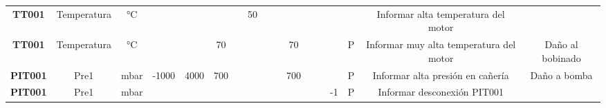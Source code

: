 \begin{table}
\begin{tabular}{ccccccccccccccccc}
		\textbf{TT001}                            & Temperatura                        & °C                                 &                                            &                                            &                                              &                                           & 50                                        &                                              &                                              &                                              &                                           &                                           &                                              &                                            & Informar alta temperatura del motor     &                                        \\
		\textbf{TT001}                            & Temperatura                        & °C                                 &                                            &                                            & 70                                           &                                           &                                           &                                              &                                              & 70                                           &                                           &                                           &                                              & P                                          & Informar muy alta temperatura del motor & Daño al bobinado                       \\
		\textbf{PIT001}                           & Pre1                               & mbar                               & -1000                                      & 4000                                       & 700                                          &                                           &                                           &                                              &                                              & 700                                          &                                           &                                           &                                              & P                                          & Informar alta presión en cañería        & Daño a bomba                           \\
		\textbf{PIT001}                           & Pre1                               & mbar                               &                                            &                                            &                                              &                                           &                                           &                                              &                                              &                                              &                                           &                                           & -1                                           & P                                          & Informar desconexión PIT001             &                                        \\

\end{tabular}
\end{table}

